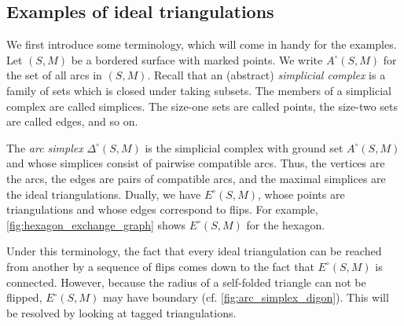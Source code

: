 \subsection{Examples of ideal triangulations}

We first introduce some terminology, which will come in handy for the examples. Let
$(S, M)$ be a bordered surface with marked points. We write $A^\circ(S, M)$ for the set of all arcs in $(S, M)$. Recall that an (abstract)
\emph{simplicial complex} is a family of sets which is closed
under taking subsets. The members of a simplicial complex are called simplices. The
size-one sets are called points, the size-two sets are called edges, and so on.

The \emph{arc simplex} $\Delta^\circ (S, M)$ is the simplicial complex with ground set $A^\circ(S, M)$ and
whose simplices consist of pairwise compatible arcs. Thus, the vertices are the arcs,
the edges are pairs of compatible arcs, and the maximal simplices are the ideal
triangulations. Dually, we have $E^\circ(S, M)$,
whose points are triangulations and whose edges correspond to flips. For example,
\cref{fig:hexagon_exchange_graph} shows $E^\circ(S, M)$ for the hexagon.

Under this terminology, the fact that every ideal triangulation can be reached from
another by a sequence of flips comes down to the fact that $E^\circ(S,M)$ is connected.
However, because the radius of a self-folded triangle can not be flipped, $E^\circ(S,
	M)$ may have boundary (cf. \cref{fig:arc_simplex_digon}). This will be resolved by
looking at tagged triangulations.

